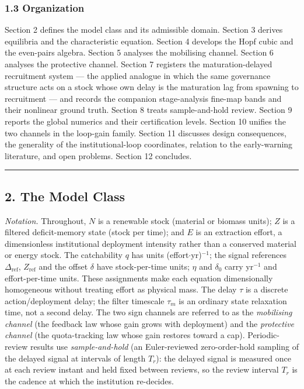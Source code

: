 \documentclass[11pt]{article}
\begin{document}
\subsubsection{1.3 Organization}\label{organization}

Section 2 defines the model class and its admissible domain. Section 3
derives equilibria and the characteristic equation. Section 4 develops
the Hopf cubic and the even-pairs algebra. Section 5 analyses the
mobilising channel. Section 6 analyses the protective channel. Section 7
registers the maturation-delayed recruitment system --- the applied
analogue in which the same governance structure acts on a stock whose
own delay is the maturation lag from spawning to recruitment --- and
records the companion stage-analysis fine-map bands and their nonlinear
ground truth. Section 8 treats sample-and-hold review. Section 9 reports
the global numerics and their certification levels. Section 10 unifies
the two channels in the loop-gain family. Section 11 discusses design
consequences, the generality of the institutional-loop coordinates,
relation to the early-warning literature, and open problems. Section 12
concludes.

\begin{center}\rule{0.5\linewidth}{0.5pt}\end{center}

\subsection{2. The Model Class}\label{the-model-class}

\emph{Notation.} Throughout, \(N\) is a renewable stock (material or
biomass units); \(Z\) is a filtered deficit-memory state (stock per
time); and \(E\) is an extraction effort, a dimensionless institutional
deployment intensity rather than a conserved material or energy stock.
The catchability \(q\) has units (effort\ensuremath{\cdot}yr)\(^{-1}\); the signal
references \(\Delta_{\mathrm{ref}}\), \(Z_{\mathrm{ref}}\) and the
offset \(\delta\) have stock-per-time units; \(\eta\) and \(\delta_0\)
carry yr\(^{-1}\) and effort-per-time units. These assignments make each
equation dimensionally homogeneous without treating effort as physical
mass. The delay \(\tau\) is a discrete action/deployment delay; the
filter timescale \(\tau_m\) is an ordinary state relaxation time, not a
second delay. The two sign channels are referred to as the
\emph{mobilising channel} (the feedback law whose gain grows with
deployment) and the \emph{protective channel} (the quota-tracking law
whose gain restores toward a cap). Periodic-review results use
\emph{sample-and-hold} (an Euler-reviewed zero-order-hold sampling of
the delayed signal at intervals of length \(T_r\)): the delayed signal
is measured once at each review instant and held fixed between reviews,
so the review interval \(T_r\) is the cadence at which the institution
re-decides.
\end{document}
